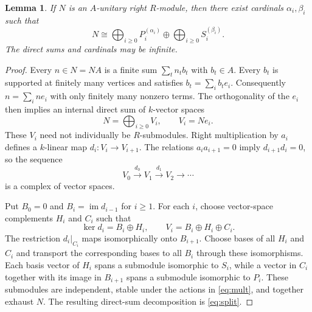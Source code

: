 \documentclass[11pt]{amsart}
\newtheorem{lemma}[theorem]{Lemma}
\theoremstyle{definition}
\theoremstyle{remark}
\begin{document}
\begin{lemma}\label{lem:complex}
If $N$ is an $A$-unitary right $R$-module, then there exist cardinals $\alpha_i,\beta_i$ such that
\begin{equation}\label{eq:split}
N\cong\bigoplus_{i\geq0}P_i^{(\alpha_i)}
\oplus\bigoplus_{i\geq0}S_i^{(\beta_i)}.
\end{equation}
The direct sums and cardinals may be infinite.
\end{lemma}
\begin{proof}
Every $n\in N=NA$ is a finite sum $\sum_t n_tb_t$ with $b_t\in A$. Every $b_t$ is supported at finitely many vertices and satisfies $b_t=\sum_i b_te_i$. Consequently $n=\sum_i ne_i$ with only finitely many nonzero terms. The orthogonality of the $e_i$ then implies an internal direct sum of $k$-vector spaces
\[
N=\bigoplus_{i\geq0}V_i,\qquad V_i=Ne_i.
\]
These $V_i$ need not individually be $R$-submodules. Right multiplication by $a_i$ defines a $k$-linear map $d_i:V_i\to V_{i+1}$. The relations $a_i a_{i+1}=0$ imply $d_{i+1}d_i=0$, so the sequence
\[
V_0\xrightarrow{d_0}V_1\xrightarrow{d_1}V_2\longrightarrow\cdots
\]
is a complex of vector spaces.

Put $B_0=0$ and $B_i=\operatorname{im}d_{i-1}$ for $i\geq1$. For each $i$, choose vector-space complements $H_i$ and $C_i$ such that
\[
\ker d_i=B_i\oplus H_i,
\qquad V_i=B_i\oplus H_i\oplus C_i.
\]
The restriction $d_i\vert_{C_i}$ maps isomorphically onto $B_{i+1}$. Choose bases of all $H_i$ and $C_i$ and transport the corresponding bases to all $B_i$ through these isomorphisms. Each basis vector of $H_i$ spans a submodule isomorphic to $S_i$, while a vector in $C_i$ together with its image in $B_{i+1}$ spans a submodule isomorphic to $P_i$. These submodules are independent, stable under the actions in \eqref{eq:mult}, and together exhaust $N$. The resulting direct-sum decomposition is \eqref{eq:split}.
\end{proof}
\end{document}
